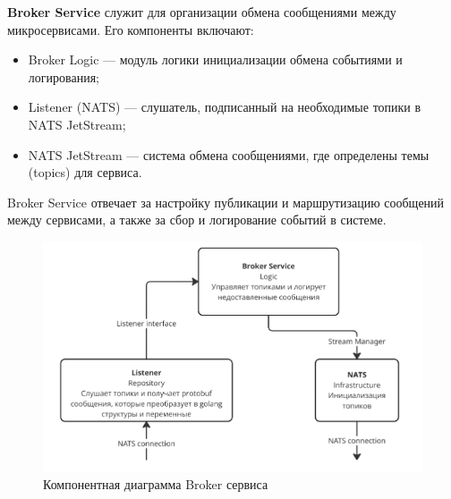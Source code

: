 \textbf{Broker Service} служит для организации обмена сообщениями между микросервисами. Его компоненты включают:
\begin{itemize}
    \item Broker Logic — модуль логики инициализации обмена событиями и логирования;
    \item Listener (NATS) — слушатель, подписанный на необходимые топики в NATS JetStream;
    \item NATS JetStream — система обмена сообщениями, где определены темы (topics) для сервиса.
\end{itemize}
Broker Service отвечает за настройку публикации и маршрутизацию сообщений между сервисами, а также за сбор и логирование событий в системе.
\begin{figure}[H]
        \centering
        \includegraphics[width=0.8\linewidth]{Images/second_chapter_backend_architecture/Picture9.png}
        \caption{Компонентная диаграмма Broker сервиса}
        \label{fig:broker-service-component-diagram}
\end{figure}

